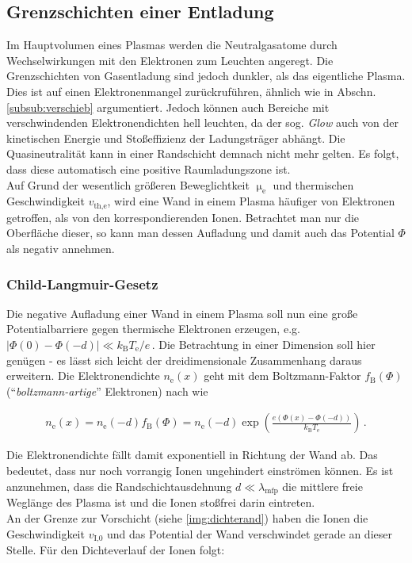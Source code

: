 \documentclass[numbers=noenddot,a4paper]{scrartcl}
\newcommand{\ix}[1]{_\text{#1}}
\newcommand{\tilt}[1]{\textit{#1}}
\begin{document}
		\subsection{Grenzschichten einer Entladung}\label{sub:rand}

			Im Hauptvolumen eines Plasmas werden die Neutralgasatome durch Wechselwirkungen mit den Elektronen zum Leuchten angeregt. Die Grenzschichten von Gasentladung sind jedoch dunkler, als das eigentliche Plasma. Dies ist auf einen Elektronenmangel zur\"uckruf\"uhren, ähnlich wie in Abschn. \ref{subsub:verschieb} argumentiert. Jedoch können auch Bereiche mit verschwindenden Elektronendichten hell leuchten, da der sog. \tilt{Glow} auch von der kinetischen Energie und Stoßeffizienz der Ladungsträger abhängt. Die Quasineutralit\"at kann in einer Randschicht demnach nicht mehr gelten. Es folgt, dass diese automatisch eine positive Raumladungszone ist. \\
			Auf Grund der wesentlich gr\"o{\ss}eren Beweglichtkeit $\upmu\ix{e}$ und thermischen Geschwindigkeit $v\ix{th,e}$, wird eine Wand in einem Plasma h\"aufiger von Elektronen getroffen, als von den korrespondierenden Ionen. Betrachtet man nur die Oberfl\"ache dieser, so kann man dessen Aufladung und damit auch das Potential $\Phi$ als negativ annehmen.

		\subsubsection{Child-Langmuir-Gesetz} \label{subsub:childlang}

		Die negative Aufladung einer Wand in einem Plasma soll nun eine große Potentialbarriere gegen thermische Elektronen erzeugen, e.g. $|\Phi\left(0\right)-\Phi\left(-d\right)|\ll k\ix{B}T\ix{e}/e\,$. Die Betrachtung in einer Dimension soll hier genügen - es lässt sich leicht der dreidimensionale Zusammenhang daraus erweitern. Die Elektronendichte $n\ix{e}\left(x\right)$ geht mit dem Boltzmann-Faktor $f\ix{B}\left(\Phi\right)$ ("`\tilt{boltzmann-artige}"' Elektronen) nach \cite{Piel10} wie

			\begin{align}
				n\ix{e}\left(x\right)=n\ix{e}\left(-d\right)f\ix{B}\left(\Phi\right)=n\ix{e}\left(-d\right)\exp\left(\frac{e\left(\Phi\left(x\right)-\Phi\left(-d\right)\right)}{k\ix{B}T\ix{e}}\right) \, . \label{eq:randschichtdichte}
			\end{align}

		Die Elektronendichte fällt damit exponentiell in Richtung der Wand ab. Das bedeutet, dass nur noch vorrangig Ionen ungehindert einströmen können. Es ist anzunehmen, dass die Randschichtausdehnung $d\ll\lambda\ix{mfp}$ die mittlere freie Weglänge des Plasma ist und die Ionen stoßfrei darin eintreten.\\
		An der Grenze zur Vorschicht (siehe \ref{img:dichterand}) haben die Ionen die Geschwindigkeit $v\ix{I,0}$ und das Potential der Wand verschwindet gerade an dieser Stelle. Für den Dichteverlauf der Ionen folgt:
\end{document}
